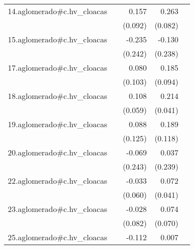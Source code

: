 {\begin{longtable}{l*{4}{D{.}{.}{-1}}}
\addlinespace
14.aglomerado#c.hv\_cloacas&                     &       0.157         &       0.263\sym{**} &                     \\
            &                     &     (0.092)         &     (0.082)         &                     \\
\addlinespace
15.aglomerado#c.hv\_cloacas&                     &      -0.235         &      -0.130         &                     \\
            &                     &     (0.242)         &     (0.238)         &                     \\
\addlinespace
17.aglomerado#c.hv\_cloacas&                     &       0.080         &       0.185\sym{*}  &                     \\
            &                     &     (0.103)         &     (0.094)         &                     \\
\addlinespace
18.aglomerado#c.hv\_cloacas&                     &       0.108         &       0.214\sym{***}&                     \\
            &                     &     (0.059)         &     (0.041)         &                     \\
\addlinespace
19.aglomerado#c.hv\_cloacas&                     &       0.088         &       0.189         &                     \\
            &                     &     (0.125)         &     (0.118)         &                     \\
\addlinespace
20.aglomerado#c.hv\_cloacas&                     &      -0.069         &       0.037         &                     \\
            &                     &     (0.243)         &     (0.239)         &                     \\
\addlinespace
22.aglomerado#c.hv\_cloacas&                     &      -0.033         &       0.072         &                     \\
            &                     &     (0.060)         &     (0.041)         &                     \\
\addlinespace
23.aglomerado#c.hv\_cloacas&                     &      -0.028         &       0.074         &                     \\
            &                     &     (0.082)         &     (0.070)         &                     \\
\addlinespace
25.aglomerado#c.hv\_cloacas&                     &      -0.112         &       0.007         &                     \\

\end{longtable}}
